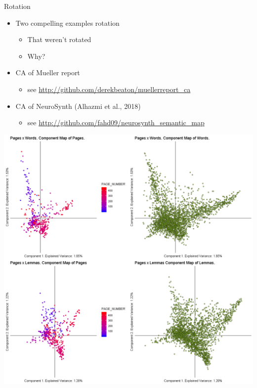 \documentclass[
  ignorenonframetext,
]{beamer}
\providecommand{\tightlist}{%
  \setlength{\itemsep}{0pt}\setlength{\parskip}{0pt}}
\begin{document}
\begin{frame}{Rotation}
\protect\hypertarget{rotation}{}

\begin{itemize}[<+->]
\tightlist
\item
  Two compelling examples rotation

  \begin{itemize}[<+->]
  \tightlist
  \item
    That weren't rotated
  \item
    Why?
  \end{itemize}
\item
  CA of Mueller report

  \begin{itemize}[<+->]
  \tightlist
  \item
    see \url{http://github.com/derekbeaton/muellerreport_ca}
  \end{itemize}
\item
  CA of NeuroSynth (Alhazmi et al., 2018)

  \begin{itemize}[<+->]
  \tightlist
  \item
    see \url{http://github.com/fahd09/neurosynth_semantic_map}
  \end{itemize}
\end{itemize}

\end{frame}

\begin{frame}

\includegraphics{../Images/mueller_report_CA.png}

\end{frame}
\end{document}
